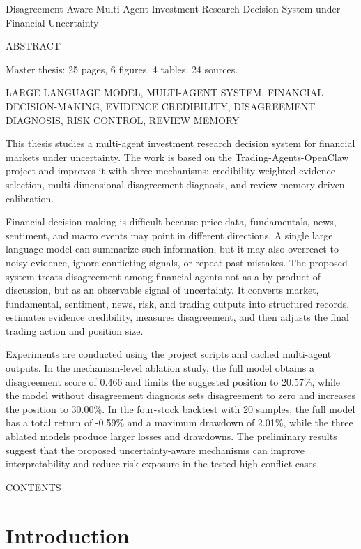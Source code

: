 \documentclass[14pt,a4paper]{extarticle}
\makeatletter
\newcommand{\MajorHeadingNoToc}[1]{%
  \clearpage
  \phantomsection
  \begin{center}
    \normalfont\normalsize #1
  \end{center}
  \vspace{1.5\baselineskip}
}
\newcommand{\ManualTableOfContents}{%
  \clearpage
  \phantomsection
  \begin{center}
    \normalfont\normalsize CONTENTS
  \end{center}
  \vspace{1.5\baselineskip}
  \begingroup
    \setlength{\parindent}{0pt}
    \@starttoc{toc}
  \endgroup
}
\makeatother
\begin{document}
\begin{center}
  \normalfont\normalsize
  Disagreement-Aware Multi-Agent Investment Research Decision System under Financial Uncertainty
\end{center}

\MajorHeadingNoToc{ABSTRACT}

Master thesis: 25 pages, 6 figures, 4 tables, 24 sources.

LARGE LANGUAGE MODEL, MULTI-AGENT SYSTEM, FINANCIAL DECISION-MAKING, EVIDENCE CREDIBILITY, DISAGREEMENT DIAGNOSIS, RISK CONTROL, REVIEW MEMORY

This thesis studies a multi-agent investment research decision system for financial markets under uncertainty. The work is based on the Trading-Agents-OpenClaw project and improves it with three mechanisms: credibility-weighted evidence selection, multi-dimensional disagreement diagnosis, and review-memory-driven calibration.

Financial decision-making is difficult because price data, fundamentals, news, sentiment, and macro events may point in different directions. A single large language model can summarize such information, but it may also overreact to noisy evidence, ignore conflicting signals, or repeat past mistakes. The proposed system treats disagreement among financial agents not as a by-product of discussion, but as an observable signal of uncertainty. It converts market, fundamental, sentiment, news, risk, and trading outputs into structured records, estimates evidence credibility, measures disagreement, and then adjusts the final trading action and position size.

Experiments are conducted using the project scripts and cached multi-agent outputs. In the mechanism-level ablation study, the full model obtains a disagreement score of 0.466 and limits the suggested position to 20.57\%, while the model without disagreement diagnosis sets disagreement to zero and increases the position to 30.00\%. In the four-stock backtest with 20 samples, the full model has a total return of -0.59\% and a maximum drawdown of 2.01\%, while the three ablated models produce larger losses and drawdowns. The preliminary results suggest that the proposed uncertainty-aware mechanisms can improve interpretability and reduce risk exposure in the tested high-conflict cases.

\ManualTableOfContents

\section{Introduction}
\end{document}
